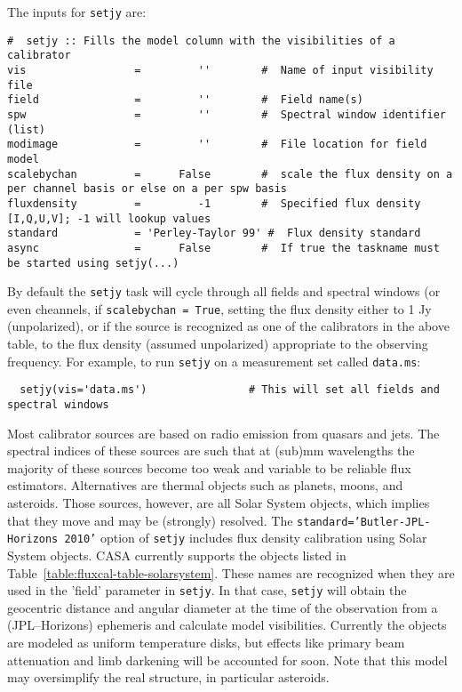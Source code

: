 The inputs for {\tt setjy} are:
\small
\begin{verbatim}
#  setjy :: Fills the model column with the visibilities of a calibrator
vis                 =         ''        #  Name of input visibility file
field               =         ''        #  Field name(s)
spw                 =         ''        #  Spectral window identifier (list)
modimage            =         ''        #  File location for field model
scalebychan         =      False        #  scale the flux density on a per channel basis or else on a per spw basis
fluxdensity         =         -1        #  Specified flux density [I,Q,U,V]; -1 will lookup values
standard            = 'Perley-Taylor 99' #  Flux density standard
async               =      False        #  If true the taskname must be started using setjy(...)
\end{verbatim}
\normalsize By default the {\tt setjy} task will cycle through all
fields and spectral windows (or even cheannels, if {\tt scalebychan =
  True}, setting the flux density either to 1 Jy (unpolarized), or if
the source is recognized as one of the calibrators in the above table,
to the flux density (assumed unpolarized) appropriate to the observing
frequency.  For example, to run {\tt setjy} on a measurement set
called {\tt data.ms}: \small
\begin{verbatim}
  setjy(vis='data.ms')                # This will set all fields and spectral windows
\end{verbatim}
\normalsize


Most calibrator sources are based on radio emission from quasars and
jets. The spectral indices of these sources are such that at (sub)mm
wavelengths the majority of these sources become too weak and variable
to be reliable flux estimators. Alternatives are thermal objects such
as planets, moons, and asteroids. Those sources, however, are all
Solar System objects, which implies that they move and may be
(strongly) resolved. The {\tt standard='Butler-JPL-Horizons 2010'}
option of {\tt setjy} includes flux density calibration using Solar
System objects. CASA currently supports the objects listed in
Table~\ref{table:fluxcal-table-solarsystem}. These names are
recognized when they are used in the 'field'
parameter in {\tt setjy}.  In that case, {\tt setjy} will obtain the
geocentric distance and angular diameter at the time of the
observation from a (JPL--Horizons) ephemeris and calculate model
visibilities.  Currently the objects are modeled as uniform
temperature disks, but effects like primary beam attenuation and limb
darkening will be accounted for soon. Note that this model may
oversimplify the real structure, in particular asteroids.

